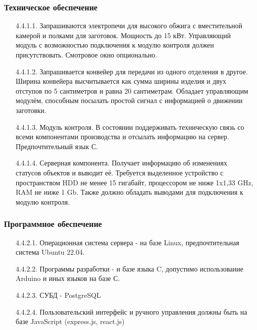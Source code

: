 \documentclass[16pt,a4paper]{article}
\begin{document}
\subsubsection{Техническое обеспечение}
\begin{enumerate}
    \item [4.4.1.1.] Запрашиваются электропечи для высокого обжига с вместительной камерой и полками для заготовок. Мощность до 15 кВт. Управляющий модуль с возможностью подключения к модулю контроля должен присутствовать. Смотровое окно опционально.
    \item [4.4.1.2.] Запрашивается конвейер для передачи из одного отделения в другое. Ширина конвейера высчитывается как сумма ширины изделия и двух отступов по 5 сантиметров и равна 20 сантиметрам. Обладает управляющим модулём, способным посылать простой сигнал с информацией о движении заготовки.
    \item [4.4.1.3.] Модуль контроля. В состоянии поддерживать техническую связь со всеми компонентами производства и отсылать информацию на сервер. Предпочтительный язык С.
    \item [4.4.1.4.] Серверная компонента. Получает информацию об изменениях статусов объектов и выводит её. Требуется выделенное устройство с пространством HDD не менее 15 гигабайт, процессором не ниже 1x1,33 GHz, RAM не ниже 1 Gb. Также должно обладать выводами для подключения к модулю контроля.
\end{enumerate}

\subsubsection{Программное обеспечение}
\begin{enumerate}
    \item [4.4.2.1.] Операционная система сервера - на базе Linux, предпочтительная система Ubuntu 22.04.
    \item [4.4.2.2.] Программы разработки - н базе языка C, допустимо использование Arduino и иных языков на базе С. 
    \item [4.4.2.3.] СУБД - PostgreSQL
    \item [4.4.2.4.] Пользовательский интерфейс и ручного управления должны быть на базе JavaScript (express.js, react.js)
\end{enumerate}
\end{document}
